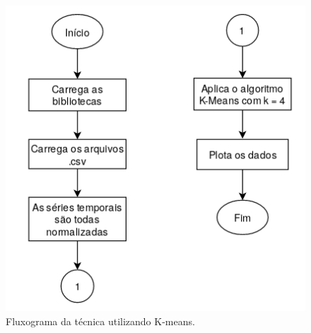 \begin{figure}[H]
    \caption{Fluxograma da técnica utilizando K-means.}
    \begin{center}
        \includegraphics[scale=.65]{metodologia/img/k-means.png}
    \end{center}
    \label{fig:}
\end{figure}